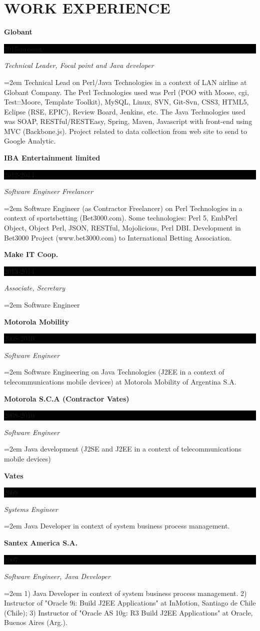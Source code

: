 \documentclass[paper=a4,fontsize=11pt]{scrartcl} %
\newcommand{\sepspace}{\vspace*{1em}}		%
\newcommand{\NewPart}[1]{\section*{\uppercase{#1}}}
\newcommand{\EducationEntry}[4]{
		\noindent \textbf{#1} \hfill      %
		\colorbox{Black}{%
			\parbox{6em}{%
			\hfill\color{White}#2}} \par  %
		\noindent \textit{#3} \par        %
		\noindent\hangindent=2em\hangafter=0 \small #4 %
		\normalsize \par}
\begin{document}
\NewPart{Work experience}{}

\EducationEntry{Globant}{2015-present}{Technical Leader, Focal point and Java developer}
{Technical Lead on Perl/Java Technologies in a context of LAN airline at Globant Company. The Perl Technologies used was Perl (POO with Moose, cgi, Test::Moore, Template Toolkit), MySQL, Linux, SVN, Git-Svn, CSS3, HTML5, Eclipse (RSE, EPIC), Review Board, Jenkins, etc. The Java Technologies used was SOAP, RESTful/RESTEasy, Spring, Maven, Javascript with front-end using MVC (Backbone.js). Project related to data collection from web site to send to Google Analytic.}
\sepspace

\EducationEntry{IBA Entertainment limited}{2012-2014}{Software Engineer Freelancer}
{Software Engineer (as Contractor Freelancer) on Perl Technologies in a context of sportsbetting (Bet3000.com). Some technologies: Perl 5, EmbPerl Object, Object Perl, JSON, RESTful, Mojolicious, Perl DBI. Development in Bet3000 Project (www.bet3000.com) to International Betting Association.}
\sepspace

\EducationEntry{Make IT Coop.}{2013-2014}{Associate, Secretary}{
Software Engineer}
\sepspace

\EducationEntry{Motorola Mobility}{2008-2010}{Software Engineer}
{Software Engineering on Java Technologies (J2EE in a context of telecommunications mobile devices) at Motorola Mobility of Argentina S.A.}
\sepspace

\EducationEntry{Motorola S.C.A (Contractor Vates)}{2008-2010}{Software Engineer}
{Java development (J2SE and J2EE in a context of telecommunications mobile devices)}
\sepspace

\EducationEntry{Vates}{2008}{Systems Engineer}
{Java Developer in context of system business process management.}
\sepspace

\EducationEntry{Santex America S.A.}{2007}{Software Engineer, Java Developer}
{1) Java Developer in context of system business process management. 2) Instructor of "Oracle 9i: Build J2EE Applications" at InMotion, Santiago de Chile (Chile);
3) Instructor of "Oracle AS 10g: R3 Build J2EE Applications" at Oracle, Buenos Aires (Arg.).}
\sepspace
\end{document}
